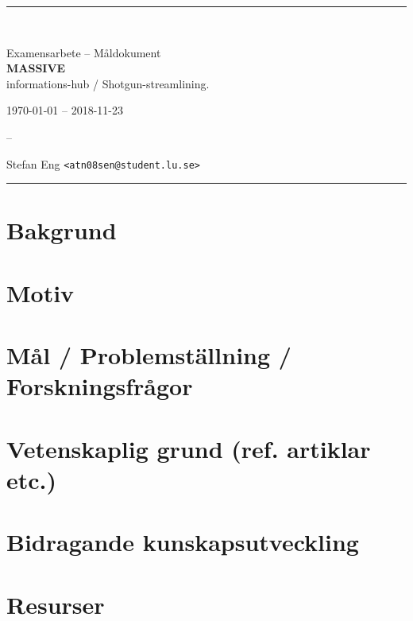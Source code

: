 \documentclass{article}
\begin{document}
\begin{center}

  \hrule \ \\

  \vspace{0.5cm}

  {\huge Examensarbete -- Måldokument} \\
  {\large{\textbf{MASSIVE}}} \\
  informations-hub / Shotgun-streamlining.

  \vspace{0.25cm}

  {\today} -- 2018-11-23 \\

  \vspace{0.25cm}

  --

  \vspace{0.25cm}

  Stefan Eng \texttt{<atn08sen@student.lu.se>}

  \vspace{0.5cm}

  \hrule

\end{center}

\section{Bakgrund}

\section{Motiv}

\section{Mål / Problemställning / Forskningsfrågor}

\section{Vetenskaplig grund (ref. artiklar etc.)}

\section{Bidragande kunskapsutveckling}

\section{Resurser}
\end{document}
